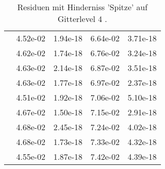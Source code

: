 \begin{table}
\begin{tabular}{c|cc|cc|}
\multicolumn{1}{|c|}{} & \multicolumn{1}{|c|}{  4.52e-02} & \multicolumn{1}{|c|}{  1.94e-18} & \multicolumn{1}{|c|}{  6.64e-02} & \multicolumn{1}{|c|}{  3.71e-18} \\ 
\multicolumn{1}{|c|}{} & \multicolumn{1}{|c|}{  4.62e-02} & \multicolumn{1}{|c|}{  1.74e-18} & \multicolumn{1}{|c|}{  6.76e-02} & \multicolumn{1}{|c|}{  3.24e-18} \\ 
\multicolumn{1}{|c|}{} & \multicolumn{1}{|c|}{  4.63e-02} & \multicolumn{1}{|c|}{  2.14e-18} & \multicolumn{1}{|c|}{  6.87e-02} & \multicolumn{1}{|c|}{  3.51e-18} \\ 
\multicolumn{1}{|c|}{} & \multicolumn{1}{|c|}{  4.63e-02} & \multicolumn{1}{|c|}{  1.77e-18} & \multicolumn{1}{|c|}{  6.97e-02} & \multicolumn{1}{|c|}{  2.37e-18} \\ 
\multicolumn{1}{|c|}{} & \multicolumn{1}{|c|}{  4.51e-02} & \multicolumn{1}{|c|}{  1.92e-18} & \multicolumn{1}{|c|}{  7.06e-02} & \multicolumn{1}{|c|}{  5.10e-18} \\ 
\multicolumn{1}{|c|}{} & \multicolumn{1}{|c|}{  4.67e-02} & \multicolumn{1}{|c|}{  1.50e-18} & \multicolumn{1}{|c|}{  7.15e-02} & \multicolumn{1}{|c|}{  2.91e-18} \\ 
\multicolumn{1}{|c|}{} & \multicolumn{1}{|c|}{  4.68e-02} & \multicolumn{1}{|c|}{  2.45e-18} & \multicolumn{1}{|c|}{  7.24e-02} & \multicolumn{1}{|c|}{  4.02e-18} \\ 
\multicolumn{1}{|c|}{} & \multicolumn{1}{|c|}{  4.68e-02} & \multicolumn{1}{|c|}{  1.73e-18} & \multicolumn{1}{|c|}{  7.33e-02} & \multicolumn{1}{|c|}{  4.32e-18} \\ 
\multicolumn{1}{|c|}{} & \multicolumn{1}{|c|}{  4.55e-02} & \multicolumn{1}{|c|}{  1.87e-18} & \multicolumn{1}{|c|}{  7.42e-02} & \multicolumn{1}{|c|}{  4.39e-18} \\ 
\hline 
\end{tabular}\caption{Residuen mit Hinderniss 'Spitze' auf Gitterlevel 4 .}\label{tab:Residuum_Spitze_level4}
\end{table} 
